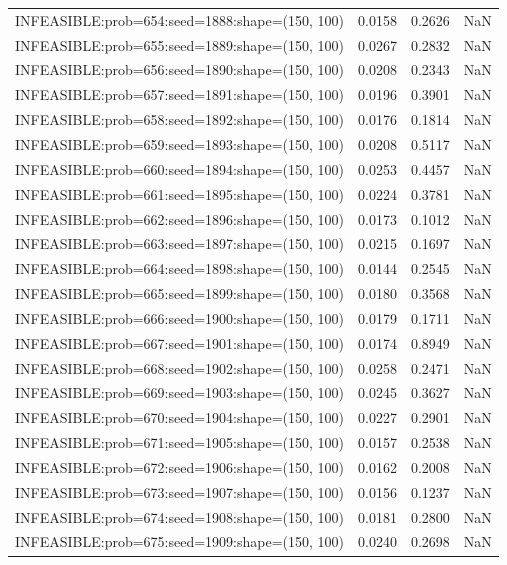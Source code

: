 \begin{longtable}{lccc}
INFEASIBLE:prob=654:seed=1888:shape=(150, 100) &   0.0158 &  0.2626 &    NaN \\
INFEASIBLE:prob=655:seed=1889:shape=(150, 100) &   0.0267 &  0.2832 &    NaN \\
INFEASIBLE:prob=656:seed=1890:shape=(150, 100) &   0.0208 &  0.2343 &    NaN \\
INFEASIBLE:prob=657:seed=1891:shape=(150, 100) &   0.0196 &  0.3901 &    NaN \\
INFEASIBLE:prob=658:seed=1892:shape=(150, 100) &   0.0176 &  0.1814 &    NaN \\
INFEASIBLE:prob=659:seed=1893:shape=(150, 100) &   0.0208 &  0.5117 &    NaN \\
INFEASIBLE:prob=660:seed=1894:shape=(150, 100) &   0.0253 &  0.4457 &    NaN \\
INFEASIBLE:prob=661:seed=1895:shape=(150, 100) &   0.0224 &  0.3781 &    NaN \\
INFEASIBLE:prob=662:seed=1896:shape=(150, 100) &   0.0173 &  0.1012 &    NaN \\
INFEASIBLE:prob=663:seed=1897:shape=(150, 100) &   0.0215 &  0.1697 &    NaN \\
INFEASIBLE:prob=664:seed=1898:shape=(150, 100) &   0.0144 &  0.2545 &    NaN \\
INFEASIBLE:prob=665:seed=1899:shape=(150, 100) &   0.0180 &  0.3568 &    NaN \\
INFEASIBLE:prob=666:seed=1900:shape=(150, 100) &   0.0179 &  0.1711 &    NaN \\
INFEASIBLE:prob=667:seed=1901:shape=(150, 100) &   0.0174 &  0.8949 &    NaN \\
INFEASIBLE:prob=668:seed=1902:shape=(150, 100) &   0.0258 &  0.2471 &    NaN \\
INFEASIBLE:prob=669:seed=1903:shape=(150, 100) &   0.0245 &  0.3627 &    NaN \\
INFEASIBLE:prob=670:seed=1904:shape=(150, 100) &   0.0227 &  0.2901 &    NaN \\
INFEASIBLE:prob=671:seed=1905:shape=(150, 100) &   0.0157 &  0.2538 &    NaN \\
INFEASIBLE:prob=672:seed=1906:shape=(150, 100) &   0.0162 &  0.2008 &    NaN \\
INFEASIBLE:prob=673:seed=1907:shape=(150, 100) &   0.0156 &  0.1237 &    NaN \\
INFEASIBLE:prob=674:seed=1908:shape=(150, 100) &   0.0181 &  0.2800 &    NaN \\
INFEASIBLE:prob=675:seed=1909:shape=(150, 100) &   0.0240 &  0.2698 &    NaN \\

\end{longtable}
